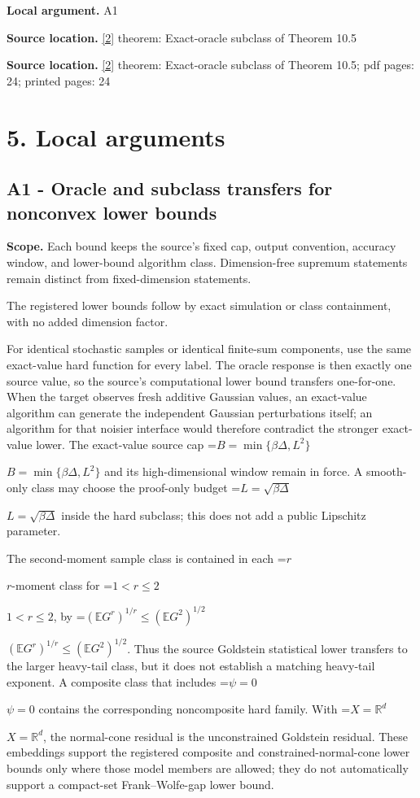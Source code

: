 \documentclass[10pt,a4paper]{article}
\newcommand{\AtlasMath}[1]{\par\begingroup\centering\setbox0=\hbox{$\displaystyle #1$}\ifdim\wd0>1.4\linewidth\typeout{ATLAS WIDE FORMULA: \the\wd0}\fi\ifdim\wd0>\linewidth\resizebox{\linewidth}{!}{\box0}\else\box0\fi\par\endgroup}
\newcommand{\AtlasInlineMath}[1]{\begingroup\setbox0=\hbox{$#1$}\ifdim\wd0>.4\linewidth\endgroup\AtlasMath{#1}\else\endgroup$#1$\fi}
\begin{document}
\textbf{Local argument.} A1

\textbf{Source location.} \href{https://arxiv.org/html/2610.19652v1}{[2]} theorem: Exact-oracle subclass of Theorem 10.5

\textbf{Source location.} \href{https://arxiv.org/html/2610.19652v1}{[2]} theorem: Exact-oracle subclass of Theorem 10.5; pdf pages: 24; printed pages: 24

\section{5. Local arguments}
\subsection{A1 - Oracle and subclass transfers for nonconvex lower bounds}
\textbf{Scope.} Each bound keeps the source's fixed cap, output convention, accuracy window, and lower-bound algorithm class. Dimension-free supremum statements remain distinct from fixed-dimension statements.

The registered lower bounds follow by exact simulation or class containment, with no added dimension factor.

For identical stochastic samples or identical finite-sum components, use the same exact-value hard function for every label. The oracle response is then exactly one source value, so the source's computational lower bound transfers one-for-one. When the target observes fresh additive Gaussian values, an exact-value algorithm can generate the independent Gaussian perturbations itself; an algorithm for that noisier interface would therefore contradict the stronger exact-value lower. The exact-value source cap \AtlasInlineMath{B=\min\{\beta\Delta,L^2\}} and its high-dimensional window remain in force. A smooth-only class may choose the proof-only budget \AtlasInlineMath{L=\sqrt{\beta\Delta}} inside the hard subclass; this does not add a public Lipschitz parameter.

The second-moment sample class is contained in each \AtlasInlineMath{r}-moment class for \AtlasInlineMath{1<r\le2}, by \AtlasInlineMath{(\mathbb EG^r)^{1/r}\le(\mathbb EG^2)^{1/2}}. Thus the source Goldstein statistical lower transfers to the larger heavy-tail class, but it does not establish a matching heavy-tail exponent. A composite class that includes \AtlasInlineMath{\psi=0} contains the corresponding noncomposite hard family. With \AtlasInlineMath{X=\mathbb R^d}, the normal-cone residual is the unconstrained Goldstein residual. These embeddings support the registered composite and constrained-normal-cone lower bounds only where those model members are allowed; they do not automatically support a compact-set Frank--Wolfe-gap lower bound.
\end{document}
